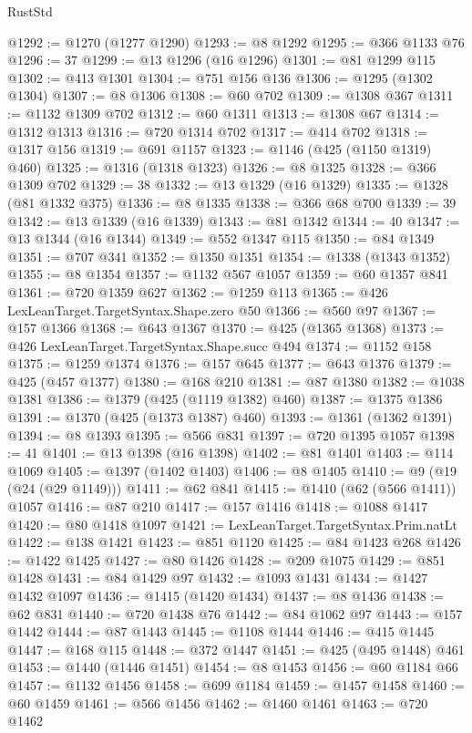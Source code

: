 \begin{lexlean}{RustStd}
\begin{coremodule}
@1292 := @1270 (@1277 @1290)
@1293 := @8 @1292
@1295 := @366 @1133 @76
@1296 := 37
@1299 := @13 @1296 (@16 @1296)
@1301 := @81 @1299 @115
@1302 := @413 @1301
@1304 := @751 @156 @136
@1306 := @1295 (@1302 @1304)
@1307 := @8 @1306
@1308 := @60 @702
@1309 := @1308 @367
@1311 := @1132 @1309 @702
@1312 := @60 @1311
@1313 := @1308 @67
@1314 := @1312 @1313
@1316 := @720 @1314 @702
@1317 := @414 @702
@1318 := @1317 @156
@1319 := @691 @1157
@1323 := @1146 (@425 (@1150 @1319) @460)
@1325 := @1316 (@1318 @1323)
@1326 := @8 @1325
@1328 := @366 @1309 @702
@1329 := 38
@1332 := @13 @1329 (@16 @1329)
@1335 := @1328 (@81 @1332 @375)
@1336 := @8 @1335
@1338 := @366 @68 @700
@1339 := 39
@1342 := @13 @1339 (@16 @1339)
@1343 := @81 @1342
@1344 := 40
@1347 := @13 @1344 (@16 @1344)
@1349 := @552 @1347 @115
@1350 := @84 @1349
@1351 := @707 @341
@1352 := @1350 @1351
@1354 := @1338 (@1343 @1352)
@1355 := @8 @1354
@1357 := @1132 @567 @1057
@1359 := @60 @1357 @841
@1361 := @720 @1359 @627
@1362 := @1259 @113
@1365 := @426 LexLeanTarget.TargetSyntax.Shape.zero @50
@1366 := @560 @97
@1367 := @157 @1366
@1368 := @643 @1367
@1370 := @425 (@1365 @1368)
@1373 := @426 LexLeanTarget.TargetSyntax.Shape.succ @494
@1374 := @1152 @158
@1375 := @1259 @1374
@1376 := @157 @645
@1377 := @643 @1376
@1379 := @425 (@457 @1377)
@1380 := @168 @210
@1381 := @87 @1380
@1382 := @1038 @1381
@1386 := @1379 (@425 (@1119 @1382) @460)
@1387 := @1375 @1386
@1391 := @1370 (@425 (@1373 @1387) @460)
@1393 := @1361 (@1362 @1391)
@1394 := @8 @1393
@1395 := @566 @831
@1397 := @720 @1395 @1057
@1398 := 41
@1401 := @13 @1398 (@16 @1398)
@1402 := @81 @1401
@1403 := @114 @1069
@1405 := @1397 (@1402 @1403)
@1406 := @8 @1405
@1410 := @9 (@19 (@24 (@29 @1149)))
@1411 := @62 @841
@1415 := @1410 (@62 (@566 @1411)) @1057
@1416 := @87 @210
@1417 := @157 @1416
@1418 := @1088 @1417
@1420 := @80 @1418 @1097
@1421 := LexLeanTarget.TargetSyntax.Prim.natLt
@1422 := @138 @1421
@1423 := @851 @1120
@1425 := @84 @1423 @268
@1426 := @1422 @1425
@1427 := @80 @1426
@1428 := @209 @1075
@1429 := @851 @1428
@1431 := @84 @1429 @97
@1432 := @1093 @1431
@1434 := @1427 @1432 @1097
@1436 := @1415 (@1420 @1434)
@1437 := @8 @1436
@1438 := @62 @831
@1440 := @720 @1438 @76
@1442 := @84 @1062 @97
@1443 := @157 @1442
@1444 := @87 @1443
@1445 := @1108 @1444
@1446 := @415 @1445
@1447 := @168 @115
@1448 := @372 @1447
@1451 := @425 (@495 @1448) @461
@1453 := @1440 (@1446 @1451)
@1454 := @8 @1453
@1456 := @60 @1184 @66
@1457 := @1132 @1456
@1458 := @699 @1184
@1459 := @1457 @1458
@1460 := @60 @1459
@1461 := @566 @1456
@1462 := @1460 @1461
@1463 := @720 @1462

\end{coremodule}
\end{lexlean}
